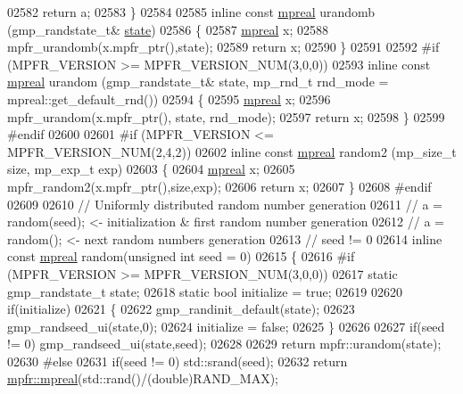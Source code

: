 \begin{DoxyCode}
{{02582     \textcolor{keywordflow}{return} a;
02583 \}
02584 
02585 \textcolor{keyword}{inline} \textcolor{keyword}{const} \hyperlink{classmpfr_1_1mpreal}{mpreal} urandomb (gmp\_randstate\_t& \hyperlink{structstate}{state})
02586 \{
02587     \hyperlink{classmpfr_1_1mpreal}{mpreal} x;
02588     mpfr\_urandomb(x.mpfr\_ptr(),state);
02589     \textcolor{keywordflow}{return} x;
02590 \}
02591 
02592 \textcolor{preprocessor}{#if (MPFR\_VERSION >= MPFR\_VERSION\_NUM(3,0,0))}
02593 \textcolor{keyword}{inline} \textcolor{keyword}{const} \hyperlink{classmpfr_1_1mpreal}{mpreal} urandom (gmp\_randstate\_t& state, mp\_rnd\_t rnd\_mode = mpreal::get\_default\_rnd())
02594 \{
02595     \hyperlink{classmpfr_1_1mpreal}{mpreal} x;
02596     mpfr\_urandom(x.mpfr\_ptr(), state, rnd\_mode);
02597     \textcolor{keywordflow}{return} x;
02598 \}
02599 \textcolor{preprocessor}{#endif}
02600 
02601 \textcolor{preprocessor}{#if (MPFR\_VERSION <= MPFR\_VERSION\_NUM(2,4,2))}
02602 \textcolor{keyword}{inline} \textcolor{keyword}{const} \hyperlink{classmpfr_1_1mpreal}{mpreal} random2 (mp\_size\_t size, mp\_exp\_t exp)
02603 \{
02604     \hyperlink{classmpfr_1_1mpreal}{mpreal} x;
02605     mpfr\_random2(x.mpfr\_ptr(),size,exp);
02606     \textcolor{keywordflow}{return} x;
02607 \}
02608 \textcolor{preprocessor}{#endif}
02609 
02610 \textcolor{comment}{// Uniformly distributed random number generation}
02611 \textcolor{comment}{// a = random(seed); <- initialization & first random number generation}
02612 \textcolor{comment}{// a = random();     <- next random numbers generation}
02613 \textcolor{comment}{// seed != 0}
02614 \textcolor{keyword}{inline} \textcolor{keyword}{const} \hyperlink{classmpfr_1_1mpreal}{mpreal} random(\textcolor{keywordtype}{unsigned} \textcolor{keywordtype}{int} seed = 0)
02615 \{
02616 \textcolor{preprocessor}{#if (MPFR\_VERSION >= MPFR\_VERSION\_NUM(3,0,0))}
02617     \textcolor{keyword}{static} gmp\_randstate\_t state;
02618     \textcolor{keyword}{static} \textcolor{keywordtype}{bool} initialize = \textcolor{keyword}{true};
02619 
02620     \textcolor{keywordflow}{if}(initialize)
02621     \{
02622         gmp\_randinit\_default(state);
02623         gmp\_randseed\_ui(state,0);
02624         initialize = \textcolor{keyword}{false};
02625     \}
02626 
02627     \textcolor{keywordflow}{if}(seed != 0)    gmp\_randseed\_ui(state,seed);
02628 
02629     \textcolor{keywordflow}{return} mpfr::urandom(state);
02630 \textcolor{preprocessor}{#else}
02631     \textcolor{keywordflow}{if}(seed != 0)    std::srand(seed);
02632     \textcolor{keywordflow}{return} \hyperlink{classmpfr_1_1mpreal}{mpfr::mpreal}(std::rand()/(\textcolor{keywordtype}{double})RAND\_MAX);
}}
\end{DoxyCode}
